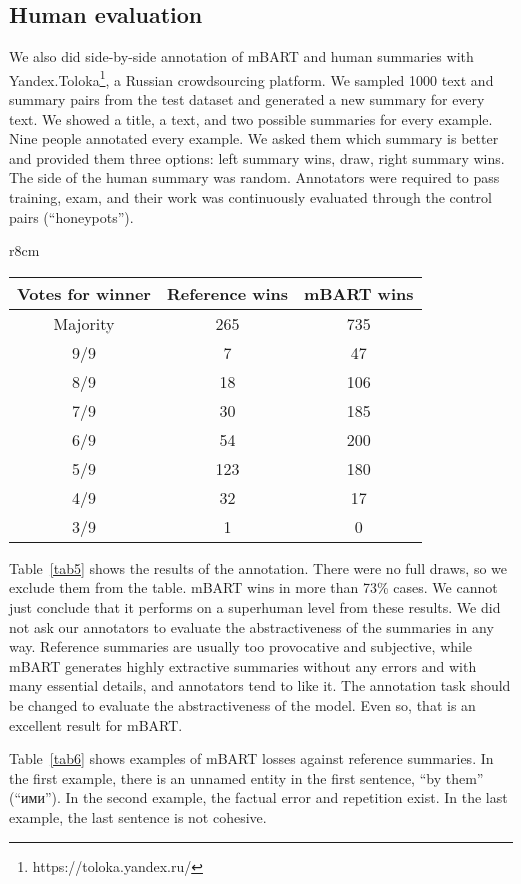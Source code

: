 \documentclass[runningheads]{llncs}
\begin{document}
\subsection{Human evaluation}
We also did side-by-side annotation of mBART and human summaries with Yandex.Toloka\footnote{https://toloka.yandex.ru/}, a Russian crowdsourcing platform. We sampled 1000 text and summary pairs from the test dataset and generated a new summary for every text. We showed a title, a text, and two possible summaries for every example. Nine people annotated every example. We asked them which summary is better and provided them three options: left summary wins, draw, right summary wins. The side of the human summary was random. Annotators were required to pass training, exam, and their work was continuously evaluated through the control pairs (``honeypots'').

\begin{wraptable}{r}{8cm}
\caption{Human side-by-side evaluation}\label{tab5}
\centering
\begin{tabular}{|c|c|c|}\hline
Votes for winner & Reference wins & mBART wins \\\hline
Majority & 265 & 735\\\hline
9/9 & 7 & 47 \\
8/9 & 18 & 106\\
7/9 & 30 & 185\\
6/9 & 54 & 200\\
5/9 & 123 & 180\\
4/9 & 32 & 17\\
3/9 & 1 & 0\\
\hline
\end{tabular}
\end{wraptable}

Table~\ref{tab5} shows the results of the annotation. There were no full draws, so we exclude them from the table. mBART wins in more than 73\% cases. We cannot just conclude that it performs on a superhuman level from these results. We did not ask our annotators to evaluate the abstractiveness of the summaries in any way. Reference summaries are usually too provocative and subjective, while mBART generates highly extractive summaries without any errors and with many essential details, and annotators tend to like it. The annotation task should be changed to evaluate the abstractiveness of the model. Even so, that is an excellent result for mBART.

Table~\ref{tab6} shows examples of mBART losses against reference summaries. In the first example, there is an unnamed entity in the first sentence, ``by them'' (``ими''). In the second example, the factual error and repetition exist. In the last example, the last sentence is not cohesive.
\end{document}
